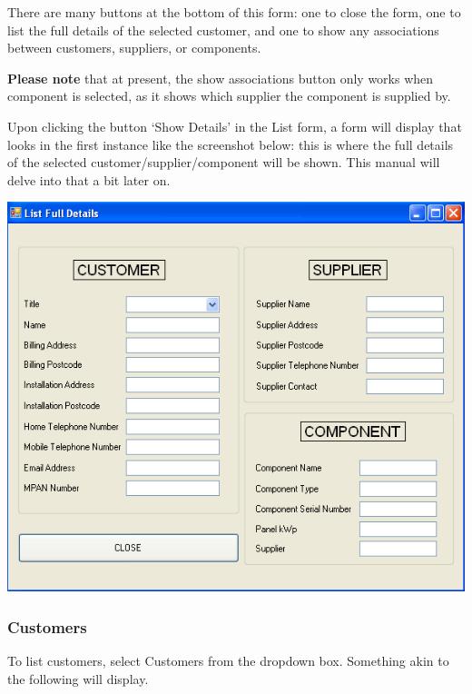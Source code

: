 		There are many buttons at the bottom of this form: one to close the form, one to list the full details of the selected customer, and one to show any associations between customers, suppliers, or components.
		
		\textbf{Please note} that at present, the show associations button only works when component is selected, as it shows which supplier the component is supplied by.
		
	Upon clicking the button `Show Details' in the List form, a form will display that looks in the first instance like the screenshot below: this is where the full details of the selected customer\slash supplier\slash component will be shown.  This manual will delve into that a bit later on.
	
	\includegraphics[scale=0.25]{frmListFullDetails_scrot}
	
		\subsubsection{Customers}
		
		To list customers, select Customers from the dropdown box.  Something akin to the following will display\footnotemark.
		
